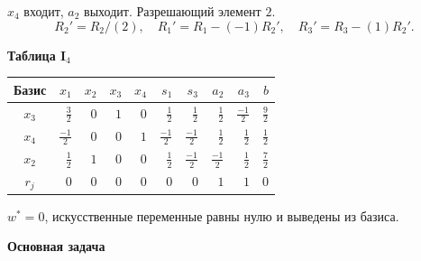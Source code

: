 \documentclass[12pt,a4paper]{article}
\begin{document}
$x_{4}$ входит, $a_{2}$ выходит. Разрешающий элемент $2$.
{\small\[R_{2}'=R_{2}/(2),\quad R_{1}'=R_{1}-(-1)R_{2}',\quad R_{3}'=R_{3}-(1)R_{2}'.\]}
\par\textbf{Таблица I$_{4}$}\begin{center}\small\setlength{\tabcolsep}{4pt}\begin{tabular}{c|rrrrrrrr|r}\hline
Базис & $x_{1}$ & $x_{2}$ & $x_{3}$ & $x_{4}$ & $s_{1}$ & $s_{3}$ & $a_{2}$ & $a_{3}$ & $b$\\\hline
$x_{3}$ & $\frac{3}{2}$ & $0$ & $1$ & $0$ & $\frac{1}{2}$ & $\frac{1}{2}$ & $\frac{1}{2}$ & $\frac{-1}{2}$ & $\frac{9}{2}$\\
$x_{4}$ & $\frac{-1}{2}$ & $0$ & $0$ & $1$ & $\frac{-1}{2}$ & $\frac{-1}{2}$ & $\frac{1}{2}$ & $\frac{1}{2}$ & $\frac{1}{2}$\\
$x_{2}$ & $\frac{1}{2}$ & $1$ & $0$ & $0$ & $\frac{1}{2}$ & $\frac{-1}{2}$ & $\frac{-1}{2}$ & $\frac{1}{2}$ & $\frac{7}{2}$\\
\hline $r_j$ & $0$ & $0$ & $0$ & $0$ & $0$ & $0$ & $1$ & $1$ & $0$\\\hline\end{tabular}\end{center}
$w^*=0$, искусственные переменные равны нулю и выведены из базиса.
\newpage
\par\textbf{Основная задача}\par
\end{document}
